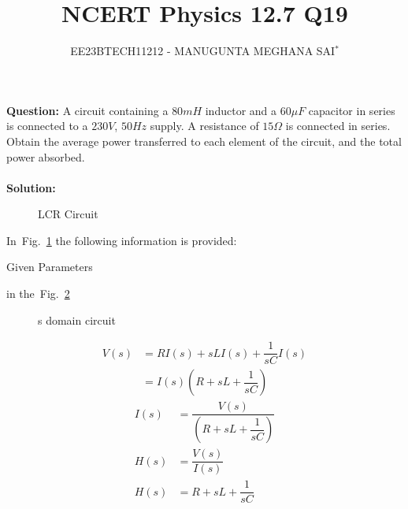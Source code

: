 \documentclass[journal,12pt,onecolumn]{IEEEtran}
\title{
	
\title{NCERT Physics 12.7 Q19}
\author{EE23BTECH11212 - MANUGUNTA MEGHANA SAI$^{*}$%
}


}
\newcommand\figref{Fig.~\ref}
\theoremstyle{remark}
\newcommand{\solution}{\noindent \textbf{Solution: }}
\begin{document}
\maketitle

\textbf{Question:} 
A circuit containing a $80 mH$ inductor and a $60 \mu F$ capacitor in series is connected to a $230 V$, $50 Hz$ supply. A resistance of $15 \Omega $ is connected in series. Obtain the average power transferred to each element of the circuit, and the total power absorbed.\\
\\

\solution
\fi
\begin{figure}[h]
	\centering
	
	\caption{LCR Circuit}
	\label{fig:msm11.7.19fig2}
\end{figure}
     
In~\figref{fig:msm11.7.19fig2} the following information is provided:
 
 

 \begin{table}[h!]
 	\centering
 	\resizebox{6 cm}{!}{
 		
 	}
 	\caption{Given Parameters}
 	\label{tab:msm11.7.19tab1} 
 \end{table} 
  in the~\figref{fig:msm11.7.19fig1}
 
 \begin{figure}[!h]
 	\centering
 	
 	\caption{s domain circuit}
 	\label{fig:msm11.7.19fig1}
 	
 \end{figure}
 \begin{align}
 	V(s) &= R I(s) + sL I(s) + \dfrac{1}{sC} I(s)\\
         &= I(s)\left(R + sL + \dfrac{1}{sC}\right)
 \end{align}
\begin{align}
    I(s) &= \dfrac{V(s)}{\left(R + sL + \dfrac{1}{sC}\right)}\\ 
    H(s) &= \dfrac{V(s)}{I(s)}\\
	H(s) &= R + sL + \dfrac{1}{sC}
\end{align}
\end{document}
